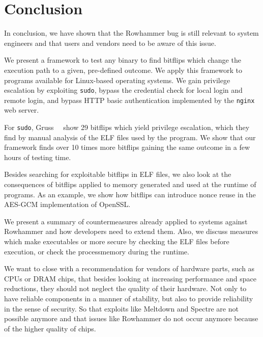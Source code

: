 \chapter{Conclusion}\label{sec:conclusion}

In conclusion, we have shown that the Rowhammer bug is still relevant to system
engineers and that users and vendors need to be aware of this issue.

We present a framework to test any binary to find bitflips which change the
execution path to a given, pre-defined outcome. We apply this framework to
programs available for Linux-based operating systems. We gain privilege
escalation by exploiting \texttt{sudo}, bypass the credential check for local
login and remote login, and bypass HTTP basic authentication implemented by the
\texttt{nginx} web server.

For \texttt{sudo}, Gruss~\etal~\cite{flipinthewall} show \num{29} bitflips which
yield privilege escalation, which they find by manual analysis of the ELF files
used by the program. We show that our framework finds over \num{10} times more
bitflips gaining the same outcome in a few hours of testing time.

Besides searching for exploitable bitflips in ELF files, we also look at the
consequences of bitflips applied to memory generated and used at the runtime  of
programs. As an example, we show how bitflips can introduce nonce reuse in the
AES-GCM implementation of OpenSSL.

We present a summary of countermeasures already applied to systems against
Rowhammer and how developers need to extend them. Also, we discuss measures
which make executables or more secure by checking the ELF files before
execution, or check the process\textquotesingle memory during the runtime.

We want to close with a recommendation for vendors of hardware parts, such as
CPUs or DRAM chips, that besides looking at increasing performance and space
reductions, they should not neglect the quality of their hardware. Not only to
have reliable components in a manner of stability, but also to provide
reliability in the sense of security. So that exploits like Meltdown and Spectre
are not possible anymore and that issues like Rowhammer do not occur anymore
because of the higher quality of chips.

